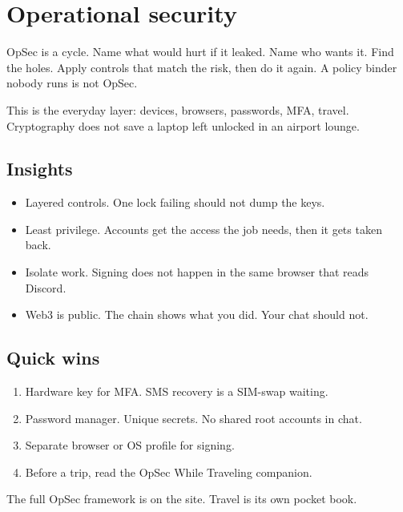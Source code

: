 \chapter{Operational security}

OpSec is a cycle. Name what would hurt if it leaked.
Name who wants it. Find the holes. Apply controls that
match the risk, then do it again. A policy binder nobody
runs is not OpSec.

This is the everyday layer: devices, browsers, passwords,
MFA, travel. Cryptography does not save a laptop left
unlocked in an airport lounge.

\section{Insights}

\begin{itemize}
  \item Layered controls. One lock failing should not
  dump the keys.
  \item Least privilege. Accounts get the access the job
  needs, then it gets taken back.
  \item Isolate work. Signing does not happen in the
  same browser that reads Discord.
  \item Web3 is public. The chain shows what you did.
  Your chat should not.
\end{itemize}

\section{Quick wins}

\begin{enumerate}
  \item Hardware key for MFA. SMS recovery is a SIM-swap
  waiting.
  \item Password manager. Unique secrets. No shared root
  accounts in chat.
  \item Separate browser or OS profile for signing.
  \item Before a trip, read the OpSec While Traveling
  companion.
\end{enumerate}

The full OpSec framework is on the site. Travel is its
own pocket book.

